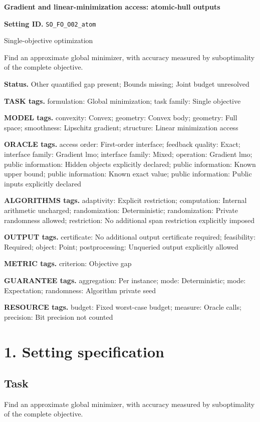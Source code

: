\documentclass[10pt,a4paper]{article}
\begin{document}
\raggedright

{\LARGE\bfseries\sffamily\color{AtlasNavy} Gradient and linear-minimization access: atomic-hull outputs\par}\vspace{5pt}
\textbf{Setting ID.} \texttt{SO\_\allowbreak{}FO\_\allowbreak{}O02\_\allowbreak{}atom}

Single-objective optimization

Find an approximate global minimizer, with accuracy measured by suboptimality of the complete objective.

\textbf{Status.} Other quantified gap present; Bounds missing; Joint budget unresolved

\textbf{TASK tags.} formulation: Global minimization; task family: Single objective

\textbf{MODEL tags.} convexity: Convex; geometry: Convex body; geometry: Full space; smoothness: Lipschitz gradient; structure: Linear minimization access

\textbf{ORACLE tags.} access order: First-order interface; feedback quality: Exact; interface family: Gradient lmo; interface family: Mixed; operation: Gradient lmo; public information: Hidden objects explicitly declared; public information: Known upper bound; public information: Known exact value; public information: Public inputs explicitly declared

\textbf{ALGORITHMS tags.} adaptivity: Explicit restriction; computation: Internal arithmetic uncharged; randomization: Deterministic; randomization: Private randomness allowed; restriction: No additional span restriction explicitly imposed

\textbf{OUTPUT tags.} certificate: No additional output certificate required; feasibility: Required; object: Point; postprocessing: Unqueried output explicitly allowed

\textbf{METRIC tags.} criterion: Objective gap

\textbf{GUARANTEE tags.} aggregation: Per instance; mode: Deterministic; mode: Expectation; randomness: Algorithm private seed

\textbf{RESOURCE tags.} budget: Fixed worst-case budget; measure: Oracle calls; precision: Bit precision not counted

\section{1. Setting specification}
\subsection{Task}
Find an approximate global minimizer, with accuracy measured by suboptimality of the complete objective.
\end{document}
